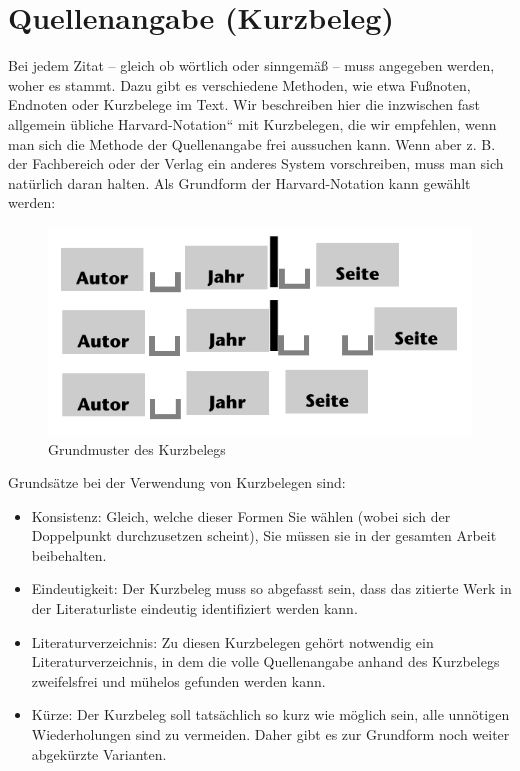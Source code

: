 \documentclass[]{book}
\providecommand{\tightlist}{%
  \setlength{\itemsep}{0pt}\setlength{\parskip}{0pt}}
\theoremstyle{definition}
\theoremstyle{definition}
\theoremstyle{definition}
\theoremstyle{remark}
\begin{document}
\section{Quellenangabe (Kurzbeleg)}\label{quellenangabe-kurzbeleg}

Bei jedem Zitat -- gleich ob wörtlich oder sinngemäß -- muss angegeben
werden, woher es stammt. Dazu gibt es verschiedene Methoden, wie etwa
Fußnoten, Endnoten oder Kurzbelege im Text. Wir beschreiben hier die
inzwischen fast allgemein übliche Harvard-Notation`` mit Kurzbelegen,
die wir empfehlen, wenn man sich die Methode der Quellenangabe frei
aussuchen kann. Wenn aber z. B. der Fachbereich oder der Verlag ein
anderes System vorschreiben, muss man sich natürlich daran halten. Als
Grundform der Harvard-Notation kann gewählt werden:

\begin{figure}

{\centering \includegraphics{images/zitieren-grundform-min} 

}

\caption{Grundmuster des Kurzbelegs}\label{fig:unnamed-chunk-23}
\end{figure}

Grundsätze bei der Verwendung von Kurzbelegen sind:

\begin{itemize}
\tightlist
\item
  Konsistenz: Gleich, welche dieser Formen Sie wählen (wobei sich der
  Doppelpunkt durchzusetzen scheint), Sie müssen sie in der gesamten
  Arbeit beibehalten.
\item
  Eindeutigkeit: Der Kurzbeleg muss so abgefasst sein, dass das zitierte
  Werk in der Literaturliste eindeutig identifiziert werden kann.
\item
  Literaturverzeichnis: Zu diesen Kurzbelegen gehört notwendig ein
  Literaturverzeichnis, in dem die volle Quellenangabe anhand des
  Kurzbelegs zweifelsfrei und mühelos gefunden werden kann.
\item
  Kürze: Der Kurzbeleg soll tatsächlich so kurz wie möglich sein, alle
  unnötigen Wiederholungen sind zu vermeiden. Daher gibt es zur
  Grundform noch weiter abgekürzte Varianten.
\end{itemize}
\end{document}
